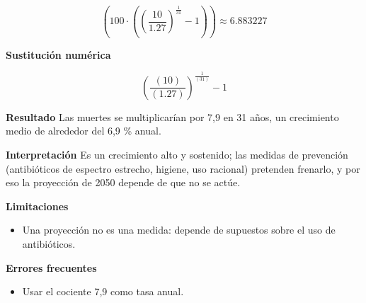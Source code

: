 \documentclass{book}
\begin{document}
\begin{tcolorbox}[title={Problema resuelto}, studiumworked, breakable]
\begin{enumerate}
\[
\left(100\cdot \left(\left(\frac{10}{1.27}\right)^{\frac{1}{31}}-1\right)\right) \approx 6.883227
\]
\end{enumerate}

\noindent\textbf{Sustitución numérica}

\[
\left(\frac{\left(10\right)}{\left(1.27\right)}\right)^{\frac{1}{\left(31\right)}} - 1
\]

\noindent\textbf{Resultado}
Las muertes se multiplicarían por 7,9 en 31 años, un crecimiento medio de alrededor del 6,9 \% anual.


\noindent\textbf{Interpretación}
Es un crecimiento alto y sostenido; las medidas de prevención (antibióticos de espectro estrecho, higiene, uso racional) pretenden frenarlo, y por eso la proyección de 2050 depende de que no se actúe.


\noindent\textbf{Limitaciones}
\begin{itemize}
\item Una proyección no es una medida: depende de supuestos sobre el uso de antibióticos.
\end{itemize}

\noindent\textbf{Errores frecuentes}
\begin{itemize}
\item Usar el cociente 7,9 como tasa anual.
\end{itemize}
\end{tcolorbox}
\end{document}
